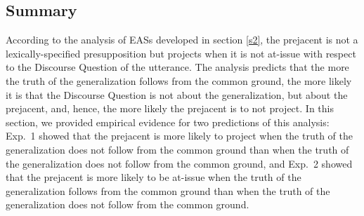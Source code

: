 \documentclass[11pt,fleqn]{article}
\newcommand{\6}{\mbox{$[\hspace*{-.6mm}[$}}
\newcommand{\9}{\mbox{$]\hspace*{-.6mm}]$}}
\begin{document}
\subsection{Summary}


According to the analysis of EASs developed in section \ref{s2}, the prejacent is not a lexically-specified presupposition but projects when it is not at-issue with respect to the Discourse Question of the utterance. The analysis predicts that the more the truth of the generalization follows from the common ground, the more likely it is that the Discourse Question is not about the generalization, but about the prejacent, and, hence, the more likely the prejacent is to not project. In this section, we provided empirical evidence for two predictions of this analysis:  Exp.~1 showed that the prejacent is more likely to project when the truth of the generalization does not follow from the common ground than when the truth of the generalization does not follow from the common ground, and Exp.~2 showed that the prejacent is more likely to be at-issue when the truth of the generalization follows from the common ground than when the truth of the generalization does not follow from the common ground.
\end{document}
